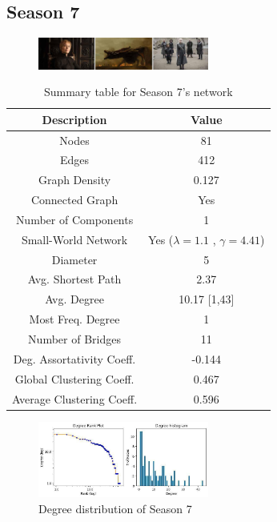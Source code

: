 \documentclass[10pt,twocolumn,letterpaper]{article}
\begin{document}
\subsection{Season 7}


\begin{figure}[!h]
    \centering
    \includegraphics[width=0.5\textwidth]{img/s7/s7_frames.jpg}
\end{figure}


\begin{table}[!h]
    \centering
    \small
    \begin{tabular}{c|c}
        Description & Value  \\
        \hline
        Nodes & 81\\
        Edges & 412 \\
        Graph Density & 0.127 \\
        Connected Graph & Yes \\
        Number of Components & 1 \\
        Small-World Network & Yes ($\lambda=1.1$ , $\gamma=4.41$) \\
        Diameter & 5 \\
        Avg. Shortest Path & 2.37 \\
        Avg. Degree & 10.17 [1,43] \\
        Most Freq. Degree & 1 \\
        Number of Bridges & 11 \\
        Deg. Assortativity Coeff. & -0.144\\
        Global Clustering Coeff. & 0.467 \\
        Average Clustering Coeff. & 0.596 \\
        \hline 
    \end{tabular}
    \vspace{0.2cm}
    \caption{Summary table for Season 7's network}
    \label{tab:my_label}
\end{table} 

\begin{figure}[!h]
    \centering
    \includegraphics[width=0.5\textwidth]{img/s7/degree_plot.jpg}
    \caption{\small{Degree distribution of Season 7}}
\end{figure}
\end{document}
